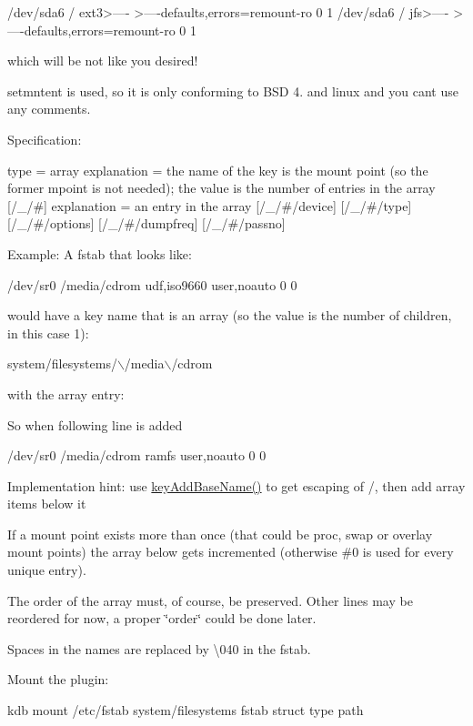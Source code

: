 \begin{DoxyCode}
/dev/sda6       /               ext3>----   >----defaults,errors=remount-ro 0 1
/dev/sda6       /               jfs>----   >----defaults,errors=remount-ro 0 1
\end{DoxyCode}


which will be not like you desired!

setmntent is used, so it is only conforming to B\+SD 4. and linux and you can\textquotesingle{}t use any comments.

Specification\+:


\begin{DoxyCode}
[/\_]
type = array
explanation = the name of the key is the mount point (so the former
  mpoint is not needed); the value is the number of entries in the
  array
[/\_/#]
explanation = an entry in the array
[/\_/#/device]
[/\_/#/type]
[/\_/#/options]
[/\_/#/dumpfreq]
[/\_/#/passno]
\end{DoxyCode}


Example\+: A fstab that looks like\+:


\begin{DoxyCode}
/dev/sr0        /media/cdrom   udf,iso9660 user,noauto     0       0
\end{DoxyCode}


would have a key name that is an array (so the value is the number of children, in this case 1)\+:


\begin{DoxyCode}
system/filesystems/\(\backslash\)/media\(\backslash\)/cdrom
\end{DoxyCode}


with the array entry\+:




So when following line is added


\begin{DoxyCode}
/dev/sr0        /media/cdrom   ramfs user,noauto     0       0
\end{DoxyCode}


Implementation hint\+: use {\ttfamily \hyperlink{group__keyname_gaa942091fc4bd5c2699e49ddc50829524}{key\+Add\+Base\+Name()}} to get escaping of {\ttfamily /}, then add array items below it

If a mount point exists more than once (that could be proc, swap or overlay mount points) the array below gets incremented (otherwise \#0 is used for every unique entry).

The order of the array must, of course, be preserved. Other lines may be reordered for now, a proper \char`\"{}order\char`\"{} could be done later.

Spaces in the names are replaced by \textbackslash{}040 in the fstab.

Mount the plugin\+:


\begin{DoxyCode}
kdb mount /etc/fstab system/filesystems fstab struct type path
\end{DoxyCode}
 